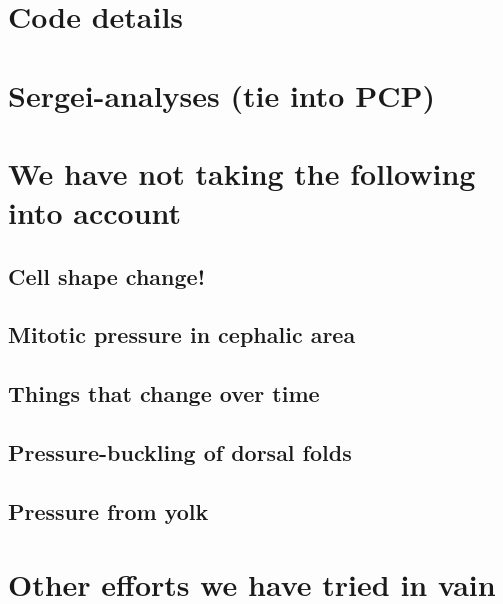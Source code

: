 \chapter*{Code details}
\label{App:Code}
\chapter*{Sergei-analyses (tie into PCP)}
\label{sec:Sergei}
\chapter*{We have not taking the following into account}
\section*{Cell shape change!}
\section*{Mitotic pressure in cephalic area}
\section*{Things that change over time}
\section*{Pressure-buckling of dorsal folds}
\section*{Pressure from yolk}
\chapter*{Other efforts we have tried in vain}


